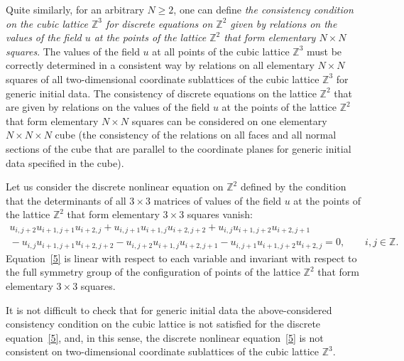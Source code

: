 \documentclass[11pt]{article}
\begin{document}
Quite similarly, for an arbitrary  $N \geq 2$, one can def\/ine {\it
the consistency condition on the cubic lattice $\mathbb{Z}^3$ for
discrete equations on $\mathbb{Z}^2$ given by relations on the
values of the field $u$ at the points of the lattice $\mathbb{Z}^2$
that form elementary $N \times N$ squares}. The values of the f\/ield
$u$ at all points of the cubic lattice $\mathbb{Z}^3$ must be
correctly determined in a consistent way by relations on all
elementary $N \times N$ squares of all two-dimensional coordinate
sublattices of the cubic lattice $\mathbb{Z}^3$ for generic initial
data. The consistency of discrete equations on the lattice
$\mathbb{Z}^2$ that are given by relations on the values of the
f\/ield $u$ at the points of the lattice $\mathbb{Z}^2$ that form
elementary $N \times N$ squares can be considered on one elementary
$N \times N \times N$ cube (the consistency of the relations on all
faces and all normal sections of the cube that are parallel to the
coordinate planes for generic initial data specif\/ied in the cube).


Let us consider the discrete nonlinear equation on
$\mathbb{Z}^2$ def\/ined by the condition that the determinants of all
$3 \times 3$ matrices of values of the f\/ield $u$ at the points of
the lattice $\mathbb{Z}^2$ that form elementary $3 \times 3$ squares
vanish:
\begin{gather}
u_{i, j + 2} u_{i + 1, j + 1} u_{i + 2, j} + u_{i, j
+ 1} u_{i + 1, j} u_{i + 2, j + 2} + u_{i, j} u_{i + 1, j +
2} u_{i + 2, j + 1}   \nonumber \\
{} - u_{i, j} u_{i + 1, j + 1} u_{i + 2, j + 2} - u_{i, j + 2} u_{i
+ 1, j} u_{i + 2, j + 1} - u_{i, j + 1} u_{i + 1, j + 2} u_{i + 2,
j} = 0, \qquad i, j \in \mathbb{Z}. \label{5}
\end{gather}
Equation~\eqref{5} is
linear with respect to each variable and invariant with respect to
the full symmetry group of the conf\/iguration of points of the
lattice $\mathbb{Z}^2$ that form elementary $3 \times 3$ squares.



It is not dif\/f\/icult to check that for generic initial data the
above-considered consistency condition on the cubic lattice is not
satisf\/ied for the discrete equation~\eqref{5}, and, in this sense,
the discrete nonlinear equation~\eqref{5} is not consistent on
two-dimensional coordinate sublattices of the cubic lattice
$\mathbb{Z}^3$.
\end{document}
